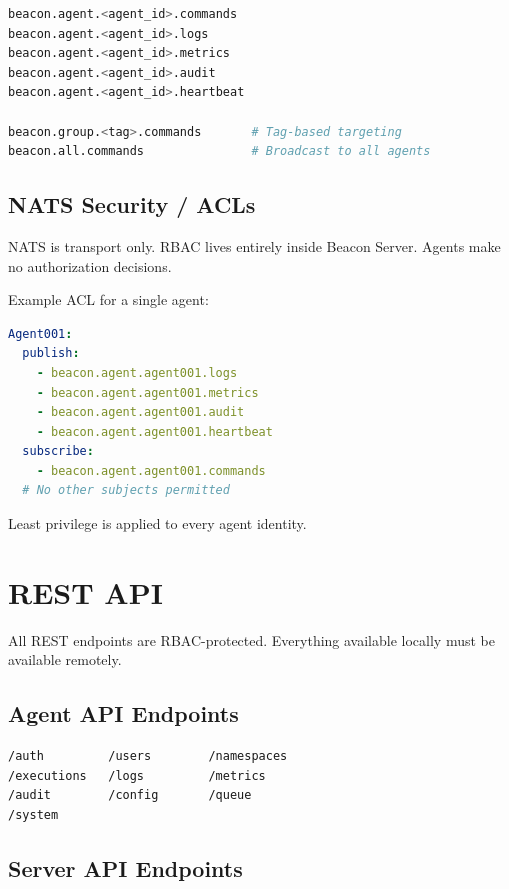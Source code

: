 \documentclass[12pt,a4paper]{article}
\begin{document}
\begin{lstlisting}[language=bash, caption={NATS subject hierarchy}]
beacon.agent.<agent_id>.commands
beacon.agent.<agent_id>.logs
beacon.agent.<agent_id>.metrics
beacon.agent.<agent_id>.audit
beacon.agent.<agent_id>.heartbeat

beacon.group.<tag>.commands       # Tag-based targeting
beacon.all.commands               # Broadcast to all agents
\end{lstlisting}

\subsection{NATS Security / ACLs}

NATS is transport only. RBAC lives entirely inside Beacon Server. Agents make no authorization decisions.

Example ACL for a single agent:

\begin{lstlisting}[language=yaml, caption={Agent001 NATS ACL}]
Agent001:
  publish:
    - beacon.agent.agent001.logs
    - beacon.agent.agent001.metrics
    - beacon.agent.agent001.audit
    - beacon.agent.agent001.heartbeat
  subscribe:
    - beacon.agent.agent001.commands
  # No other subjects permitted
\end{lstlisting}

Least privilege is applied to every agent identity.

\section{REST API}

All REST endpoints are RBAC-protected. Everything available locally must be available remotely.

\subsection{Agent API Endpoints}

\begin{lstlisting}[language=bash]
/auth         /users        /namespaces
/executions   /logs         /metrics
/audit        /config       /queue
/system
\end{lstlisting}

\subsection{Server API Endpoints}
\end{document}

